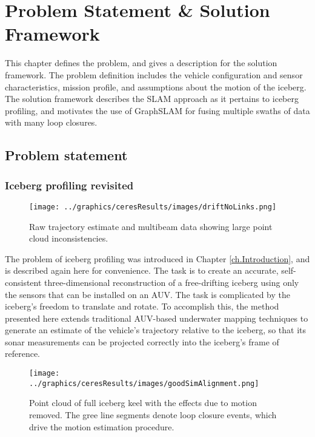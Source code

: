 
\chapter{Problem Statement \& Solution Framework}
\label{ch.ProblemStatement}

This chapter defines the problem, and gives a description for the solution framework. The problem definition includes the vehicle configuration and sensor characteristics, mission profile, and assumptions about the motion of the iceberg. The solution framework describes the SLAM approach as it pertains to iceberg profiling, and motivates the use of GraphSLAM for fusing multiple swaths of data with many loop closures. 

\section{Problem statement}

\subsection{Iceberg profiling revisited}

\begin{figure}[htb]
   \centering
   \texttt{[image: ../graphics/ceresResults/images/driftNoLinks.png]} %
   \caption{Raw trajectory estimate and multibeam data showing large point cloud inconsistencies. }
   \label{fig:DRIFT}
\end{figure}

The problem of iceberg profiling was introduced in Chapter \ref{ch.Introduction}, and is described again here for convenience. The task is to create an accurate, self-consistent three-dimensional reconstruction of a free-drifting iceberg using only the sensors that can be installed on an AUV. The task is complicated by the iceberg's freedom to translate and rotate. To accomplish this, the method presented here extends traditional AUV-based underwater mapping techniques to generate an estimate of the vehicle's trajectory relative to the iceberg, so that its sonar measurements can be projected correctly into the iceberg's frame of reference. 

\begin{figure}[htb]
   \centering
   \texttt{[image: ../graphics/ceresResults/images/goodSimAlignment.png]} %
   \caption{Point cloud of full iceberg keel with the effects due to motion removed. The gree line segments denote loop closure events, which drive the motion estimation procedure. }
   \label{fig:SOLUTION}
\end{figure}

